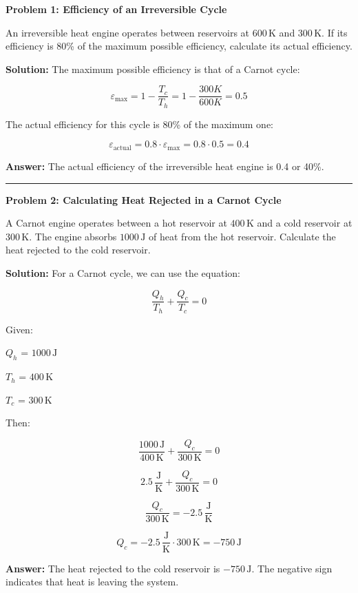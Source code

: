 \documentclass[
  9pt,
]{extbook}
\theoremstyle{definition}
\theoremstyle{definition}
\theoremstyle{definition}
\theoremstyle{remark}
\begin{document}
\textbf{Problem 1: Efficiency of an Irreversible Cycle}

An irreversible heat engine operates between reservoirs at \(600\,\text{K}\) and \(300\,\text{K}\). If its efficiency is 80\% of the maximum possible efficiency, calculate its actual efficiency.

\textbf{Solution:} The maximum possible efficiency is that of a Carnot cycle:

\[\varepsilon_{\text{max}} = 1 - \frac{T_c}{T_h} = 1 - \frac{300 K}{600 K} = 0.5\]

The actual efficiency for this cycle is 80\% of the maximum one:

\[\varepsilon_{\text{actual}} = 0.8 \cdot \varepsilon_{\text{max}} = 0.8 \cdot 0.5 = 0.4\]

\textbf{Answer:} The actual efficiency of the irreversible heat engine is 0.4 or 40\%.

\begin{center}\rule{0.5\linewidth}{0.5pt}\end{center}

\textbf{Problem 2: Calculating Heat Rejected in a Carnot Cycle}

A Carnot engine operates between a hot reservoir at \(400\,\text{K}\) and a cold reservoir at \(300\,\text{K}\). The engine absorbs \(1000\,\text{J}\) of heat from the hot reservoir. Calculate the heat rejected to the cold reservoir.

\textbf{Solution:} For a Carnot cycle, we can use the equation:

\[\frac{Q_h}{T_h} + \frac{Q_c}{T_c} = 0\]

Given:

\(Q_h\) = \(1000\,\text{J}\)

\(T_h\) = \(400\,\text{K}\)

\(T_c\) = \(300\,\text{K}\)

Then:

\[\frac{1000\,\text{J}}{400\,\text{K}} + \frac{Q_c}{300\,\text{K}} = 0\]

\[2.5\,\frac{\text{J}}{\text{K}} + \frac{Q_c}{300\,\text{K}} = 0\]

\[\frac{Q_c}{300\,\text{K}} = -2.5\,\frac{\text{J}}{\text{K}}\]

\[Q_c = -2.5\,\frac{\text{J}}{\text{K}} \cdot 300\,\text{K} = -750\,\text{J}\]

\textbf{Answer:} The heat rejected to the cold reservoir is \(-750\,\text{J}\). The negative sign indicates that heat is leaving the system.
\end{document}
